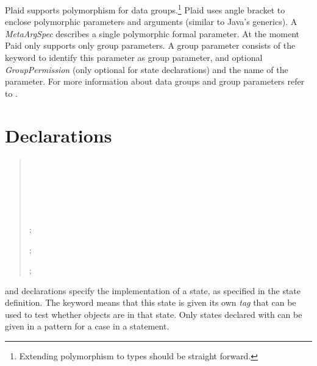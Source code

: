 Plaid supports polymorphism for data groups.\footnote{Extending
  polymorphism to types should be straight forward.} Plaid uses angle
bracket to enclose polymorphic parameters and arguments (similar to
Java's generics). A \emph{MetaArgSpec} describes a single
 polymorphic formal parameter. At the moment Paid only supports only
group parameters. A group parameter consists of the 
keyword to identify this parameter as group parameter, and optional
\emph{GroupPermission} (only optional for state declarations) and the
name of the parameter. For more information about data groups and
group parameters refer to \cite{stork09:concurrency_by_default,
  stork10:uaeminium_spec}.

\section{Declarations}

\begin{quote}

 {}

 {}


 {}     \\
          \indent~~~~~~~~~~~~~~~~~~~
          	 \opt{;}

  {}     \\
           \indent~~~~~~~~~~~~~~~~~~~ \opt{;}

 {}  ;

 {}  

 {}  ;

 {}  ;




\end{quote}

 and  declarations specify the implementation of a state,
as specified in the state definition. The  keyword means that this state is given its
own \textit{tag} that can be used to test whether objects are in that state.  Only states declared with  can be given in a pattern for a case in a  statement.

